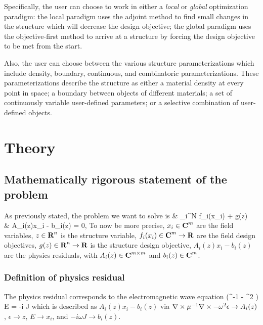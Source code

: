 \documentclass{book}
\newcommand{\reals}{{\mbox{\bf R}}}
\newcommand{\comps}{{\mbox{\bf C}}}
\begin{document}
Specifically, the user can choose to work in either
    a \emph{local} or \emph{global} optimization paradigm:
    \BI the local paradigm uses the adjoint method
            to find small changes in the structure which
            will decrease the design objective;
    \I  the global paradigm uses the objective-first method
            to arrive at a structure by forcing
            the design objective to be met from the start. \EI

Also, the user can choose between the various structure parameterizations 
    which include density, boundary, 
    continuous, and combinatoric parameterizations.
These parameterizations describe the structure as either
    \BI a material density at every point in space;
    \I  a boundary between objects of different materials;
    \I  a set of continuously variable user-defined parameters; or 
    \I  a selective combination of user-defined objects. \EI

\chapter{Theory}
\section{Mathematically rigorous statement of the problem}
As previously stated, the problem we want to solve is 
        {\minimize&  \sum_i^N f_i(x_i) + g(z) \\
        \subto&     A_i(z)x_i - b_i(z) = 0,\quad{}}
To now be more precise,
    \BI $x_i \in \comps^m$ are the field variables,
    \I  $z \in \reals^n$ is the structure variable,
    \I  $f_i(x_i) \in \comps^m \to \reals$ are the field design objectives,
    \I  $g(z) \in \reals^n \to \reals$ is the structure design objective,
    \I  $A_i(z)x_i - b_i(z)$ are the physics residuals, with
    \I  $A_i(z) \in \comps^{m \times m}$ and
    \I  $b_i(z) \in \comps^m$. \EI

\subsection{Definition of physics residual}
The physics residual corresponds to the electromagnetic wave equation
        {(\curl \mu^{-1} \curl - \omega^2 \epsilon) E = -i \omega J}
    which is described as $A_i(z)x_i - b_i(z)$ via
    \BI $\nabla\times \mu^{-1} \nabla\times - \omega^2 \epsilon \to A_i(z)$,
    \I  $\epsilon \to z$,
    \I  $E \to x_i$, and
    \I  $-i \omega J \to b_i(z)$. \EI
\end{document}
